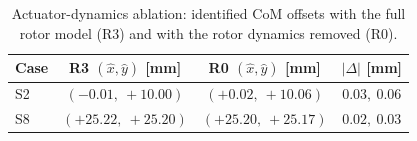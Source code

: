 \begin{table}[t]
\caption{Actuator-dynamics ablation: identified CoM offsets with the
full rotor model (R3) and with the rotor dynamics removed (R0).}
\label{tab:r0_ablation}
\centering
\begin{tabular}{@{}lccc@{}}
\toprule
Case & R3 $(\hat x, \hat y)$ [mm] & R0 $(\hat x, \hat y)$ [mm]
 & $|\Delta|$ [mm]\\
\midrule
S2 & $(-0.01,\ +10.00)$ & $(+0.02,\ +10.06)$ & $0.03,\ 0.06$\\
S8 & $(+25.22,\ +25.20)$ & $(+25.20,\ +25.17)$ & $0.02,\ 0.03$\\
\bottomrule
\end{tabular}
\end{table}
